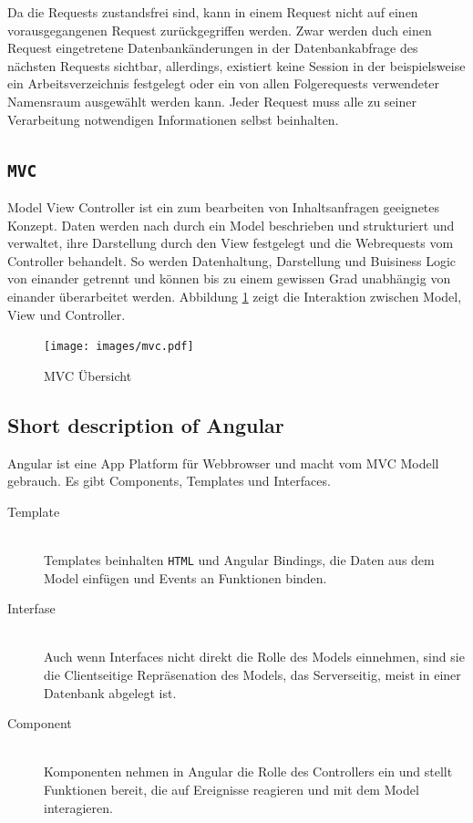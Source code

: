 Da die Requests zustandsfrei sind, kann in einem Request nicht auf
einen vorausgegangenen Request zurückgegriffen werden. Zwar werden
duch einen Request eingetretene Datenbankänderungen in der
Datenbankabfrage des nächsten Requests sichtbar, allerdings, existiert
keine Session in der beispielsweise ein Arbeitsverzeichnis festgelegt
oder ein von allen Folgerequests verwendeter Namensraum ausgewählt
werden kann. Jeder Request muss alle zu seiner Verarbeitung
notwendigen Informationen selbst beinhalten.

\subsection{\texttt{MVC}}
Model View Controller ist ein zum bearbeiten von Inhaltsanfragen geeignetes
Konzept. Daten werden nach durch ein Model beschrieben und strukturiert und
verwaltet, ihre Darstellung durch den View festgelegt und die Webrequests vom
Controller behandelt. So werden Datenhaltung, Darstellung und Buisiness Logic
von einander getrennt und können bis zu einem gewissen Grad unabhängig von
einander überarbeitet werden. Abbildung \ref{fig:mvc} zeigt die Interaktion
zwischen Model, View und Controller.

\begin{figure}
  \centering
  \texttt{[image: images/mvc.pdf]}
  \caption{MVC Übersicht}
  \label{fig:mvc}
\end{figure}

\subsection{Short description of Angular}

Angular ist eine App Platform für Webbrowser und macht vom MVC Modell gebrauch.
Es gibt Components, Templates und Interfaces.
\begin{description}
  \item[Template] \mbox{} \\ Templates beinhalten \texttt{HTML} und Angular
    Bindings, die Daten aus dem Model einfügen und Events an Funktionen binden.
  \item[Interfase] \mbox{} \\ Auch wenn Interfaces nicht direkt die Rolle des
    Models einnehmen, sind sie die Clientseitige Repräsenation des Models, das
    Serverseitig, meist in einer Datenbank abgelegt ist.
  \item[Component] \mbox{} \\ Komponenten nehmen in Angular die Rolle des
    Controllers ein und stellt Funktionen bereit, die auf Ereignisse reagieren
    und mit dem Model interagieren.
\end{description}

